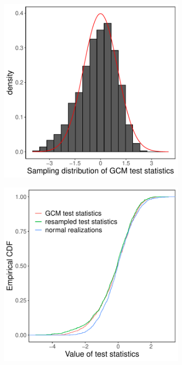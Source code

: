 \documentclass[aos]{imsart}
\theoremstyle{definition}
\theoremstyle{remark}
\begin{document}
\begin{figure}
		\begin{subfigure}[b]{0.49\textwidth}
			\centering
			\includegraphics[width=\linewidth]{Figures/sampled-test-stats.pdf} \\ 
		\end{subfigure}%
		\begin{subfigure}[b]{0.49\textwidth}
			\centering
			\includegraphics[width=\linewidth]{Figures/ecdf_comparison.pdf}

\end{subfigure}
\end{figure}
\end{document}
